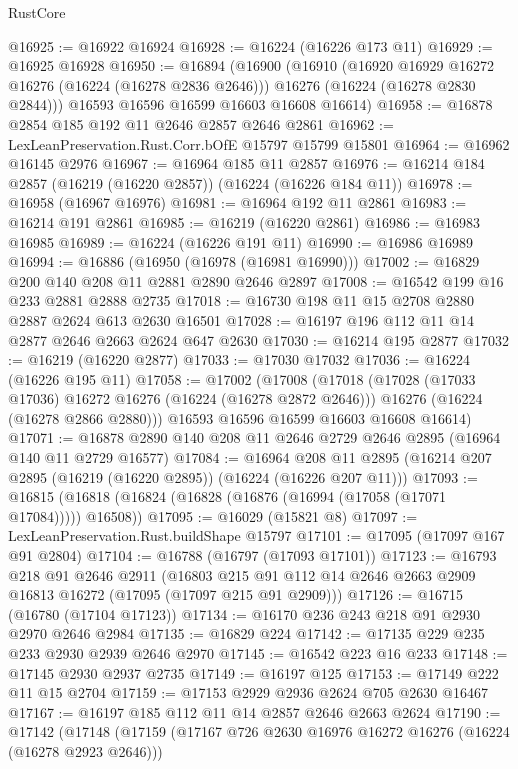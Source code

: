 \begin{lexlean}{RustCore}
\begin{coremodule}
@16925 := @16922 @16924
@16928 := @16224 (@16226 @173 @11)
@16929 := @16925 @16928
@16950 := @16894
    (@16900
      (@16910
        (@16920 @16929 @16272 @16276 (@16224 (@16278 @2836 @2646)))
        @16276
        (@16224 (@16278 @2830 @2844)))
      @16593
      @16596
      @16599
      @16603
      @16608
      @16614)
@16958 := @16878 @2854 @185 @192 @11 @2646 @2857 @2646 @2861
@16962 := LexLeanPreservation.Rust.Corr.bOfE @15797 @15799 @15801
@16964 := @16962 @16145 @2976
@16967 := @16964 @185 @11 @2857
@16976 := @16214 @184 @2857 (@16219 (@16220 @2857)) (@16224 (@16226 @184 @11))
@16978 := @16958 (@16967 @16976)
@16981 := @16964 @192 @11 @2861
@16983 := @16214 @191 @2861
@16985 := @16219 (@16220 @2861)
@16986 := @16983 @16985
@16989 := @16224 (@16226 @191 @11)
@16990 := @16986 @16989
@16994 := @16886 (@16950 (@16978 (@16981 @16990)))
@17002 := @16829 @200 @140 @208 @11 @2881 @2890 @2646 @2897
@17008 := @16542 @199 @16 @233 @2881 @2888 @2735
@17018 := @16730 @198 @11 @15 @2708 @2880 @2887 @2624 @613 @2630 @16501
@17028 := @16197 @196 @112 @11 @14 @2877 @2646 @2663 @2624 @647 @2630
@17030 := @16214 @195 @2877
@17032 := @16219 (@16220 @2877)
@17033 := @17030 @17032
@17036 := @16224 (@16226 @195 @11)
@17058 := @17002
    (@17008
      (@17018
        (@17028 (@17033 @17036) @16272 @16276 (@16224 (@16278 @2872 @2646)))
        @16276
        (@16224 (@16278 @2866 @2880)))
      @16593
      @16596
      @16599
      @16603
      @16608
      @16614)
@17071 := @16878 @2890 @140 @208 @11 @2646 @2729 @2646 @2895 (@16964 @140 @11 @2729 @16577)
@17084 := @16964
    @208
    @11
    @2895
    (@16214 @207 @2895 (@16219 (@16220 @2895)) (@16224 (@16226 @207 @11)))
@17093 := @16815 (@16818 (@16824 (@16828 (@16876 (@16994 (@17058 (@17071 @17084))))) @16508))
@17095 := @16029 (@15821 @8)
@17097 := LexLeanPreservation.Rust.buildShape @15797
@17101 := @17095 (@17097 @167 @91 @2804)
@17104 := @16788 (@16797 (@17093 @17101))
@17123 := @16793
    @218
    @91
    @2646
    @2911
    (@16803 @215 @91 @112 @14 @2646 @2663 @2909 @16813 @16272 (@17095 (@17097 @215 @91 @2909)))
@17126 := @16715 (@16780 (@17104 @17123))
@17134 := @16170 @236 @243 @218 @91 @2930 @2970 @2646 @2984
@17135 := @16829 @224
@17142 := @17135 @229 @235 @233 @2930 @2939 @2646 @2970
@17145 := @16542 @223 @16 @233
@17148 := @17145 @2930 @2937 @2735
@17149 := @16197 @125
@17153 := @17149 @222 @11 @15 @2704
@17159 := @17153 @2929 @2936 @2624 @705 @2630 @16467
@17167 := @16197 @185 @112 @11 @14 @2857 @2646 @2663 @2624
@17190 := @17142
    (@17148
      (@17159
        (@17167 @726 @2630 @16976 @16272 @16276 (@16224 (@16278 @2923 @2646)))

\end{coremodule}
\end{lexlean}
